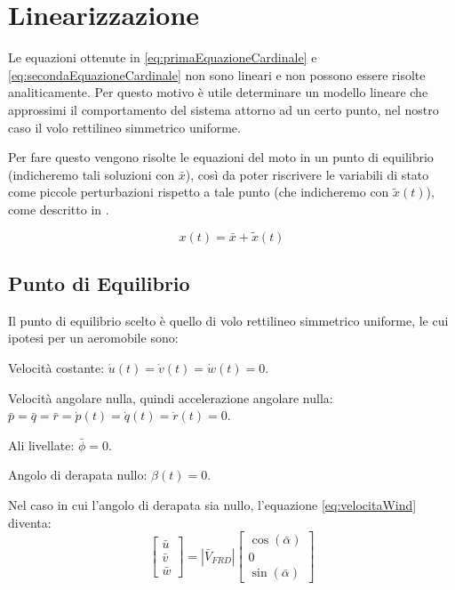 \section{Linearizzazione}
Le equazioni ottenute in \eqref{eq:primaEquazioneCardinale} e \eqref{eq:secondaEquazioneCardinale} non sono lineari e non possono essere risolte analiticamente.
Per questo motivo è utile determinare un modello lineare che approssimi il comportamento del sistema attorno ad un certo punto, nel nostro caso il volo rettilineo simmetrico uniforme.

Per fare questo vengono risolte le equazioni del moto in un punto di equilibrio (indicheremo tali soluzioni con $\bar{x}$), così da poter riscrivere le variabili di stato come piccole perturbazioni rispetto a tale punto (che indicheremo con $\widetilde{x}(t)$), come descritto in \cite{zampieri_dispensa_controlli}.

\begin{equation*}
    x(t) = \bar{x} + \tilde{x}(t)
\end{equation*}

\subsection{Punto di Equilibrio}
Il punto di equilibrio scelto è quello di volo rettilineo simmetrico uniforme, le cui ipotesi per un aeromobile sono:
\begin{sitemize}
    \item Velocità costante: $\dot{u}(t) = \dot{v}(t) = \dot{w}(t) = 0$.
    \item Velocità angolare nulla, quindi accelerazione angolare nulla: $\bar{p} = \bar{q} = \bar{r} = \dot{p}(t) = \dot{q}(t) = \dot{r}(t) = 0$.
    \item Ali livellate: $\bar{\phi} = 0$.
    \item Angolo di derapata nullo: $\beta(t) = 0$.
\end{sitemize}

Nel caso in cui l'angolo di derapata sia nullo, l'equazione \eqref{eq:velocitaWind} diventa:
\begin{equation*}
    \begin{bmatrix}
        \bar{u} \\
        \bar{v} \\
        \bar{w}
    \end{bmatrix} = |\bar{V}_{FRD}| \begin{bmatrix}
        \cos(\bar{\alpha}) \\
        0                  \\
        \sin(\bar{\alpha})
    \end{bmatrix}
\end{equation*}

